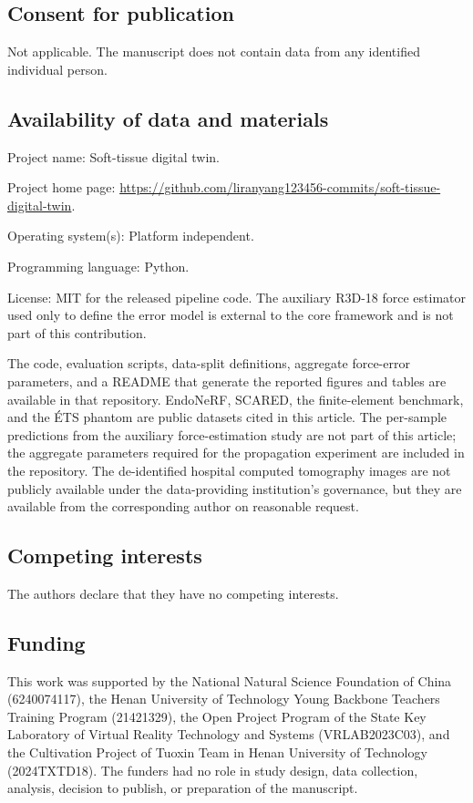 \documentclass[pdflatex,lineno,referee,sn-vancouver,Numbered]{sn-jnl}
\begin{document}
\subsection*{Consent for publication}
Not applicable. The manuscript does not contain data from any identified individual person.

\subsection*{Availability of data and materials}
Project name: Soft-tissue digital twin.

Project home page: \url{https://github.com/liranyang123456-commits/soft-tissue-digital-twin}.

Operating system(s): Platform independent.

Programming language: Python.

License: MIT for the released pipeline code. The auxiliary R3D-18 force
estimator used only to define the error model is external to the core
framework and is not part of this contribution.

The code, evaluation scripts, data-split definitions, aggregate force-error
parameters, and a README that generate the reported figures and tables are
available in that repository. EndoNeRF, SCARED, the finite-element
benchmark, and the \'ETS phantom are public datasets cited in this article.
The per-sample predictions from the auxiliary force-estimation study are
not part of this article; the aggregate parameters required for
the propagation experiment are included in the repository. The
de-identified hospital computed tomography images are not publicly
available under the data-providing institution's governance, but they
are available from the corresponding author on reasonable request.

\subsection*{Competing interests}
The authors declare that they have no competing interests.

\subsection*{Funding}
This work was supported by the National Natural Science Foundation of China (6240074117), the Henan University of Technology Young Backbone Teachers Training Program (21421329), the Open Project Program of the State Key Laboratory of Virtual Reality Technology and Systems (VRLAB2023C03), and the Cultivation Project of Tuoxin Team in Henan University of Technology (2024TXTD18). The funders had no role in study design, data collection, analysis, decision to publish, or preparation of the manuscript.
\end{document}
